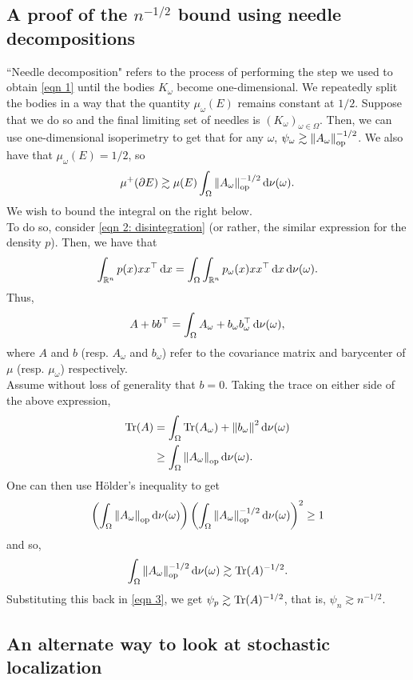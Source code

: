 \documentclass{article}
\begin{document}
\subsection{A proof of the \texorpdfstring{$n^{-1/2}$}{n-12} bound using needle decompositions}

``Needle decomposition" refers to the process of performing the step we used to obtain \eqref{eqn 1} until the bodies $K_\omega$ become one-dimensional. We repeatedly split the bodies in a way that the quantity $\mu_\omega(E)$ remains constant at $1/2$. Suppose that we do so and the final limiting set of needles is $(K_\omega)_{\omega\in\Omega}$. Then, we can use one-dimensional isoperimetry to get that for any $\omega$, $\psi_\omega \gtrsim \left\lVert A_\omega\right\rVert_{\text{op}}^{-1/2}$. We also have that $\mu_\omega(E) = 1/2$, so
\begin{equation}
	\label{eqn 3}
	\mu^+(\partial E) \gtrsim \mu(E) \int_\Omega \left\lVert A_\omega\right\rVert_{\text{op}}^{-1/2} \operatorname{d}\!{\nu}(\omega).
\end{equation}
We wish to bound the integral on the right below.\\

To do so, consider \eqref{eqn 2: disintegration} (or rather, the similar expression for the density $p$). Then, we have that
\[ \int_{\mathbb{R}^n} p(x) xx^\top \operatorname{d}\!{x} = \int_\Omega \int_{\mathbb{R}^n} p_\omega(x) xx^\top \operatorname{d}\!{x} \operatorname{d}\!{\nu(\omega)}. \]
Thus,
\[ A + bb^\top = \int_\Omega A_\omega + b_\omega b_\omega^\top \operatorname{d}\!{\nu(\omega)}, \]
where $A$ and $b$ (resp. $A_\omega$ and $b_\omega$) refer to the covariance matrix and barycenter of $\mu$ (resp. $\mu_\omega$) respectively.\\
Assume without loss of generality that $b = 0$. Taking the trace on either side of the above expression,
\begin{align*}
	\operatorname{Tr}(A) &= \int_\Omega \operatorname{Tr}(A_\omega) + \left\lVert b_\omega\right\rVert^2 \operatorname{d}\!{\nu(\omega)} \\
		&\geq \int_\Omega \left\lVert A_\omega\right\rVert_{\text{op}} \operatorname{d}\!{\nu(\omega)}.
\end{align*}
One can then use H\"older's inequality to get
\[ \left(\int_\Omega \left\lVert A_\omega\right\rVert_{\text{op}} \operatorname{d}\!{\nu(\omega)} \right) \left( \int_\Omega \left\lVert A_\omega\right\rVert_{\text{op}}^{-1/2} \operatorname{d}\!{\nu(\omega)} \right)^2 \geq 1 \]
and so,
\[ \int_\Omega \left\lVert A_\omega\right\rVert_{\text{op}}^{-1/2} \operatorname{d}\!{\nu(\omega)} \gtrsim \operatorname{Tr}(A)^{-1/2}.  \]
Substituting this back in \eqref{eqn 3}, we get $\psi_p \gtrsim \operatorname{Tr}(A)^{-1/2}$, that is, $\psi_n \gtrsim n^{-1/2}$.\\

\subsection{An alternate way to look at stochastic localization}
\end{document}
